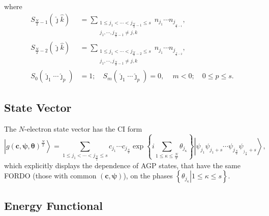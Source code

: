 \documentclass[aps,preprint]{revtex4}%
\begin{document}
where
\begin{align}
S_{\frac{N}{2}-1}\left(  \hat{\jmath}\hat{k}\right)   &  =\sum
_{\substack{1\leq j_{1}<\cdots<j_{\frac{N}{2}-1}\leq s\\j_{1},\cdots
,j_{\frac{N}{2}-1}\neq j,k}}n_{j_{1}}\cdots n_{j_{_{\frac{N}{2}-1}}},\\
S_{\frac{N}{2}-2}\left(  \hat{\jmath}\hat{k}\right)   &  =\sum
_{\substack{1\leq j_{1}<\cdots<j_{\frac{N}{2}-2}\leq s\\j_{1},\cdots
,j_{\frac{N}{2}-1}\neq j,k}}n_{j_{1}}\cdots n_{j_{_{\frac{N}{2}-2}}},\\
S_{0}\left(  \hat{\jmath}_{1}\cdots\hat{\jmath}_{p}\right)   &  =1;\quad
S_{m}\left(  \hat{\jmath}_{1}\cdots\hat{\jmath}_{p}\right)  =0,\,\quad
m<0;\quad0\leq p\leq s.
\end{align}


\subsection{State Vector\label{StateVec}}

The $N$-electron state vector has the CI form
\begin{equation}
\left\vert g\left(  \boldsymbol{c},\boldsymbol{\psi},\boldsymbol{\theta
}\right)  ^{\frac{N}{2}}\right\rangle =\sum_{1\leq j_{1}<\cdots<j_{\frac{N}%
{2}}\leq s}c_{j_{1}}\cdots c_{j_{\frac{N}{2}}}\exp\left\{  i\sum
\limits_{1\leq\kappa\leq\frac{N}{2}}\theta_{j_{\kappa}}\right\}  \left\vert
\psi_{j_{1}}\psi_{j_{1}+s}\cdots\psi_{j_{\frac{N}{2}}}\psi_{_{j_{\frac{N}{2}}%
}+s}\right\rangle ,
\end{equation}
which explicitly displays the dependence of AGP states, that have the same
FORDO (those with common $\left(  \boldsymbol{c},\boldsymbol{\psi}\right)  $),
on the phases $\left\{  \left.  \theta_{j_{\kappa}}\right\vert 1\leq\kappa\leq
s\right\}  $.

\subsection{Energy Functional\label{AGPFunc}}
\end{document}
